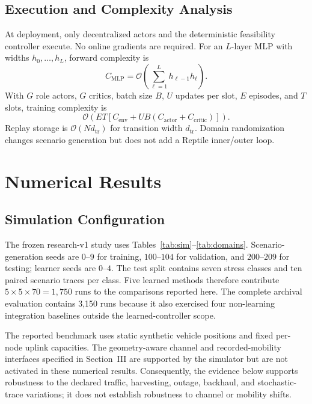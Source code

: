 \documentclass[journal]{IEEEtran}
\begin{document}
\subsection{Execution and Complexity Analysis}
At deployment, only decentralized actors and the deterministic feasibility
controller execute. No online gradients are required. For an $L$-layer MLP
with widths $h_0,\ldots,h_L$, forward complexity is
\begin{equation}
C_{\mathrm{MLP}}=\mathcal O\left(\sum_{\ell=1}^{L}h_{\ell-1}h_\ell\right).
\end{equation}
With $G$ role actors, $G$ critics, batch size $B$, $U$ updates per slot,
$E$ episodes, and $T$ slots, training complexity is
\begin{equation}
\mathcal O\left(ET\left[C_{\mathrm{env}}+UB
\left(C_{\mathrm{actor}}+C_{\mathrm{critic}}\right)\right]\right).
\end{equation}
Replay storage is $\mathcal O(Nd_{\mathrm{tr}})$ for transition width
$d_{\mathrm{tr}}$. Domain randomization changes scenario generation but does
not add a Reptile inner/outer loop.
\fi

\section{Numerical Results}
\subsection{Simulation Configuration}
The frozen research-v1 study uses Tables~\ref{tab:sim}--\ref{tab:domains}.
Scenario-generation seeds are $0$--$9$ for training, $100$--$104$ for
validation, and $200$--$209$ for testing; learner seeds are $0$--$4$. The
test split contains seven stress classes and ten paired scenario traces per
class. Five learned methods therefore contribute
$5\times5\times70=1{,}750$ runs to the comparisons reported here. The complete
archival evaluation contains 3,150 runs because it also exercised four
non-learning integration baselines outside the learned-controller scope.

The reported benchmark uses static synthetic vehicle positions and fixed
per-node uplink capacities. The geometry-aware channel and recorded-mobility
interfaces specified in Section~III are supported by the simulator but are
not activated in these numerical results. Consequently, the evidence below
supports robustness to the declared traffic, harvesting, outage, backhaul,
and stochastic-trace variations; it does not establish robustness to channel
or mobility shifts.
\end{document}

